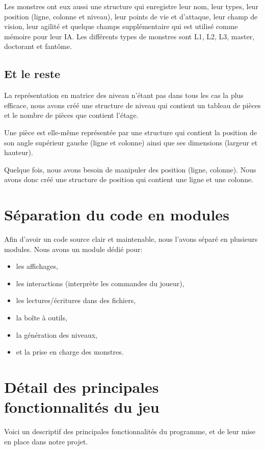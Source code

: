 \documentclass[11pt]{report}
\begin{document}
		Les monstres ont eux aussi une structure qui enregistre leur nom, leur types, leur position (ligne, colonne et niveau), leur points de vie et d'attaque, leur champ de vision, leur agilité et quelque champs supplémentaire qui est utilisé comme mémoire pour leur IA. Les différents types de monstres sont L1, L2, L3, master, doctorant et fantôme.
		
		\subsection{Et le reste}
		
		La représentation en matrice des niveau n'étant pas dans tous les cas la plus efficace, nous avons créé une structure de niveau qui contient un tableau de pièces et le nombre de pièces que contient l'étage.
		
		Une pièce est elle-même représentée par une structure qui contient la position de son angle supérieur gauche (ligne et colonne) ainsi que ses dimensions (largeur et hauteur).
		
		Quelque fois, nous avons besoin de manipuler des position (ligne, colonne). Nous avons donc créé une structure de position qui contient une ligne et une colonne. 
		
	\section{Séparation du code en modules}
	
	Afin d'avoir un code source clair et maintenable, nous l'avons séparé en plusieurs modules. Nous avons un module dédié pour:
	\begin{itemize}
		\item les affichages,
		\item les interactions (interprète les commandes du joueur),
		\item les lectures/écritures dans des fichiers,
		\item la boîte à outils,
		\item la génération des niveaux,
		\item et la prise en charge des monstres.
	\end{itemize}
	
	
	\section{Détail des principales fonctionnalités du jeu}

	Voici un descriptif des principales fonctionnalités du programme, et de leur mise en place dans notre projet.
	
\end{document}
